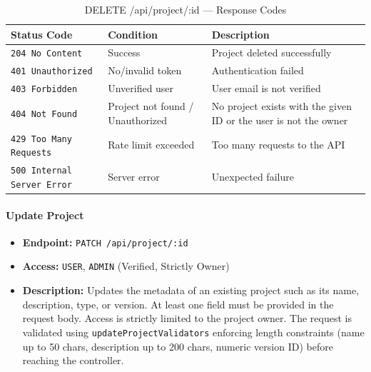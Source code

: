 \begin{table}[H]
\centering
\renewcommand{\arraystretch}{1.3}
\begin{tabularx}{\textwidth}{|l|l|X|}
\hline
\textbf{Status Code} & \textbf{Condition} & \textbf{Description} \\
\hline
\texttt{204 No Content}   & Success              & Project deleted successfully \\
\hline
\texttt{401 Unauthorized} & No/invalid token     & Authentication failed \\
\hline
\texttt{403 Forbidden}    & Unverified user & User email is not verified \\
\hline
\texttt{404 Not Found}    & Project not found / Unauthorized & No project exists with the given ID or the user is not the owner \\
\hline
\texttt{429 Too Many Requests} & Rate limit exceeded & Too many requests to the API \\
\hline
\texttt{500 Internal Server Error} & Server error & Unexpected failure \\
\hline
\end{tabularx}
\caption{DELETE /api/project/:id — Response Codes}
\label{tab:delete-project-responses}
\end{table}
\FloatBarrier

\paragraph{Update Project}
\label{subsubsec:update-project}

\begin{itemize}
  \item \textbf{Endpoint:} \texttt{PATCH /api/project/:id}
  \item \textbf{Access:} \texttt{USER}, \texttt{ADMIN} (Verified, Strictly Owner)
  \item \textbf{Description:} Updates the metadata of an existing project such as
  its name, description, type, or version.
  At least one field must be provided in the request body. Access is strictly limited to the project owner.
  The request is validated using \texttt{updateProjectValidators} enforcing length constraints (name up to 50 chars, description up to 200 chars, numeric version ID) before reaching the controller.
\end{itemize}

